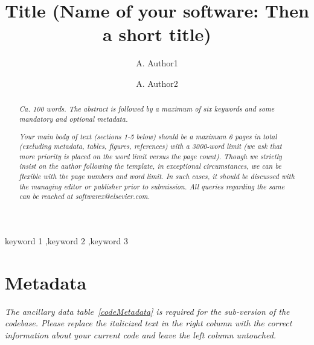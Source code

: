 \documentclass[preprint,12pt, a4paper]{elsarticle}
\begin{document}
\begin{frontmatter}
\title{Title (Name of your software: Then a short title)}


\author[label1]{A. Author1}
\author[label2]{A. Author2}
\address[label1]{Author1's affiliation, address, email}
\address[label2]{Author2's affiliation, address, email}

\begin{abstract}
\textit{Ca. 100 words. The abstract is followed by a maximum of six keywords
and some mandatory and optional metadata.}

\textit{Your main body of text (sections 1-5 below) should be a maximum 6 pages in total (excluding metadata, tables, figures, references) with a 3000-word limit (we ask that more priority is placed on the word limit versus the page count). Though we strictly insist on the author following the template, in exceptional circumstances, we can be flexible with the page numbers and word limit. In such cases, it should be discussed with the managing editor or publisher prior to submission. All queries regarding the same can be reached at softwarex@elsevier.com.}
\end{abstract}

\begin{keyword}
keyword 1 \sep keyword 2 \sep keyword 3



\end{keyword}

\end{frontmatter}


\section*{Metadata}
\label{}
\textit{The ancillary data table~\ref{codeMetadata} is required for the sub-version of the codebase. Please replace the italicized text in the right column with the correct information about your current code and leave the left column untouched.}
\end{document}
